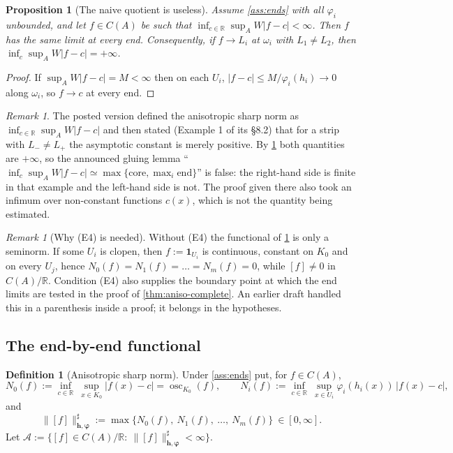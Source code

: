 \documentclass[11pt,a4paper]{article}
\numberwithin{equation}{section}
\theoremstyle{plain}
\newtheorem{proposition}[theorem]{Proposition}
\theoremstyle{definition}
\newtheorem{definition}[theorem]{Definition}
\theoremstyle{remark}
\newtheorem{remark}[theorem]{Remark}
\newcommand{\R}{\mathbb{R}}
\DeclareMathOperator{\osc}{osc}
\begin{document}
\begin{proposition}[The naive quotient is useless]\label{prop:naive-fails}
Assume \cref{ass:ends} with all $\varphi_i$ unbounded, and let $f\in C(A)$ be such that
$\inf_{c\in\R}\sup_AW|f-c|<\infty$. Then $f$ has the \emph{same} limit at every end.
Consequently, if $f\to L_i$ at $\omega_i$ with $L_1\ne L_2$, then
$\inf_{c}\sup_AW|f-c|=+\infty$.
\end{proposition}

\begin{proof}
If $\sup_AW|f-c|=M<\infty$ then on each $U_i$, $|f-c|\le M/\varphi_i(h_i)\to0$ along
$\omega_i$, so $f\to c$ at every end.
\end{proof}

\begin{remark}
The posted version defined the anisotropic sharp norm as $\inf_{c\in\R}\sup_AW|f-c|$ and
then stated (Example 1 of its \S8.2) that for a strip with $L_-\ne L_+$ the asymptotic
constant is merely positive. By \cref{prop:naive-fails} both quantities are $+\infty$, so
the announced gluing lemma ``$\inf_c\sup_AW|f-c|\simeq\max\{\text{core},\max_i\text{end}\}$''
is false: the right-hand side is finite in that example and the left-hand side is not. The
proof given there also took an infimum over non-constant functions $c(x)$, which is not
the quantity being estimated.
\end{remark}

\begin{remark}[Why (E4) is needed]\label{rem:E4}
Without (E4) the functional of \cref{def:aniso-norm} is only a seminorm. If some $U_i$ is
clopen, then $f:=\mathbf{1}_{U_i}$ is continuous, constant on $K_0$ and on every $U_j$,
hence $N_0(f)=N_1(f)=\dots=N_m(f)=0$, while $[f]\ne0$ in $C(A)/\R$. Condition (E4) also
supplies the boundary point at which the end limits are tested in the proof of
\cref{thm:aniso-complete}. An earlier draft handled this in a parenthesis inside a proof;
it belongs in the hypotheses.
\end{remark}

\subsection{The end-by-end functional}

\begin{definition}[Anisotropic sharp norm]\label{def:aniso-norm}
Under \cref{ass:ends} put, for $f\in C(A)$,
\[
N_0(f):=\inf_{c\in\R}\ \sup_{x\in K_0}|f(x)-c|=\osc_{K_0}(f),
\qquad
N_i(f):=\inf_{c\in\R}\ \sup_{x\in U_i}\varphi_i(h_i(x))\,|f(x)-c|,
\]
and
\[
\|[f]\|^{\sharp}_{\mathbf{h},\boldsymbol{\varphi}}
:=\max\bigl\{N_0(f),\ N_1(f),\ \dots,\ N_m(f)\bigr\}\ \in[0,\infty].
\]
Let $\mathcal{A}:=\{[f]\in C(A)/\R:\ \|[f]\|^{\sharp}_{\mathbf{h},\boldsymbol{\varphi}}<\infty\}$.
\end{definition}
\end{document}
